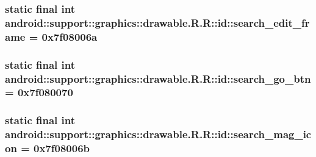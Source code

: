 \hypertarget{classandroid_1_1support_1_1graphics_1_1drawable_1_1_r_1_1id_cc3e8e350ae79d8dda3ff6e241c64c35}{
\subsubsection[{search\_\-edit\_\-frame}]{\setlength{\rightskip}{0pt plus 5cm}static final int android::support::graphics::drawable.R.R::id::search\_\-edit\_\-frame = 0x7f08006a}}
\label{classandroid_1_1support_1_1graphics_1_1drawable_1_1_r_1_1id_cc3e8e350ae79d8dda3ff6e241c64c35}


\hypertarget{classandroid_1_1support_1_1graphics_1_1drawable_1_1_r_1_1id_eeb38b34e36d6c0ae4be1f2284bde66d}{
\subsubsection[{search\_\-go\_\-btn}]{\setlength{\rightskip}{0pt plus 5cm}static final int android::support::graphics::drawable.R.R::id::search\_\-go\_\-btn = 0x7f080070}}
\label{classandroid_1_1support_1_1graphics_1_1drawable_1_1_r_1_1id_eeb38b34e36d6c0ae4be1f2284bde66d}


\hypertarget{classandroid_1_1support_1_1graphics_1_1drawable_1_1_r_1_1id_d0ba6b70d8ddeb3a1ea3d3905f6a58c6}{
\subsubsection[{search\_\-mag\_\-icon}]{\setlength{\rightskip}{0pt plus 5cm}static final int android::support::graphics::drawable.R.R::id::search\_\-mag\_\-icon = 0x7f08006b}}
\label{classandroid_1_1support_1_1graphics_1_1drawable_1_1_r_1_1id_d0ba6b70d8ddeb3a1ea3d3905f6a58c6}


